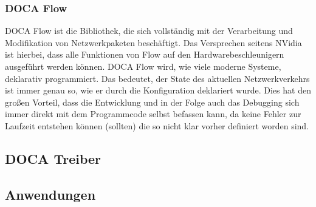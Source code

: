 \subsubsection{DOCA Flow}
DOCA Flow ist die Bibliothek, die sich vollständig mit der Verarbeitung und Modifikation von Netzwerkpaketen beschäftigt. Das Versprechen seitens NVidia ist hierbei, dass alle Funktionen von Flow auf den Hardwarebeschleunigern ausgeführt werden können. DOCA Flow wird, wie viele moderne Systeme, deklarativ programmiert. Das bedeutet, der State des aktuellen Netzwerkverkehrs ist immer genau so, wie er durch die Konfiguration deklariert wurde. Dies hat den großen Vorteil, dass die Entwicklung und in der Folge auch das Debugging sich immer direkt mit dem Programmcode selbst befassen kann, da keine Fehler zur Laufzeit entstehen können (sollten) die so nicht klar vorher definiert worden sind.
\subsection{DOCA Treiber}
\subsection{Anwendungen}
